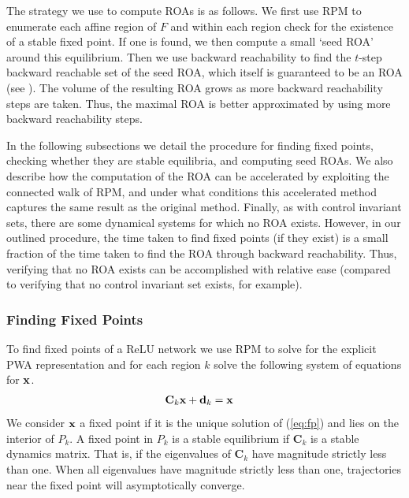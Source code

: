 The strategy we use to compute ROAs is as follows.
We first use RPM to enumerate each affine region of $F$ and within each region check for the existence of a stable fixed point.
If one is found, we then compute a small `seed ROA' around this equilibrium. 
Then we use backward reachability to find the $t$-step backward reachable set of the seed ROA, which itself is guaranteed to be an ROA (see \cite{pwa_lygeros}). 
The volume of the resulting ROA grows as more backward reachability steps are taken. Thus, the maximal ROA is better approximated by using more backward reachability steps.

In the following subsections we detail the procedure for finding fixed points, checking whether they are stable equilibria, and computing seed ROAs. 
We also describe how the computation of the ROA can be accelerated by exploiting the connected walk of RPM, and under what conditions this accelerated method captures the same result as the original method.
Finally, as with control invariant sets, there are some dynamical systems for which no ROA exists.
However, in our outlined procedure, the time taken to find fixed points (if they exist) is a small fraction of the time taken to find the ROA through backward reachability.
Thus, verifying that no ROA exists can be accomplished with relative ease (compared to verifying that no control invariant set exists, for example).

\subsubsection{Finding Fixed Points}
To find fixed points of a ReLU network we use RPM to solve for the explicit PWA representation and for each region $k$ solve the following system of equations for $\mathbf{x}$.
\begin{align}
    \mathbf{C}_k\mathbf{x} + \mathbf{d}_k &= \mathbf{x} \label{eq:fp}
\end{align}
We consider $\mathbf{x}$ a fixed point if it is the unique solution of (\ref{eq:fp}) and lies on the interior of $P_k$. 
A fixed point in $P_k$ is a stable equilibrium if $\mathbf{C}_k$ is a stable dynamics matrix. 
That is, if the eigenvalues of $\mathbf{C}_k$ have magnitude strictly less than one.
When all eigenvalues have magnitude strictly less than one, trajectories near the fixed point will asymptotically converge.

